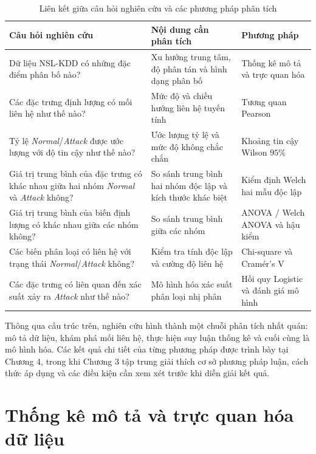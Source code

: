 \documentclass[../main.tex]{subfiles}
\begin{document}
\begin{table}[H]
\centering
\caption{Liên kết giữa câu hỏi nghiên cứu và các phương pháp phân tích}
\label{tab:t1:rq-methods}
\renewcommand{\arraystretch}{1.25}
\begin{tabularx}{\textwidth}{>{\raggedright\arraybackslash}p{} >{\raggedright\arraybackslash}p{} X}
\toprule
\textbf{Câu hỏi nghiên cứu} & \textbf{Nội dung cần phân tích} & \textbf{Phương pháp} \\
\midrule
Dữ liệu NSL-KDD có những đặc điểm phân bố nào? & Xu hướng trung tâm, độ phân tán và hình dạng phân bố & Thống kê mô tả và trực quan hóa \\
Các đặc trưng định lượng có mối liên hệ như thế nào? & Mức độ và chiều hướng liên hệ tuyến tính & Tương quan Pearson \\
Tỷ lệ \textit{Normal}/\allowbreak\textit{Attack} được ước lượng với độ tin cậy như thế nào? & Ước lượng tỷ lệ và mức độ không chắc chắn & Khoảng tin cậy Wilson $95\%$ \\
Giá trị trung bình của đặc trưng có khác nhau giữa hai nhóm \textit{Normal} và \textit{Attack} không? & So sánh trung bình hai nhóm độc lập và kích thước khác biệt & Kiểm định Welch hai mẫu độc lập \\
Giá trị trung bình của biến định lượng có khác nhau giữa các nhóm không? & So sánh trung bình giữa các nhóm & ANOVA / Welch ANOVA và hậu kiểm \\
Các biến phân loại có liên hệ với trạng thái \textit{Normal}/\allowbreak\textit{Attack} không? & Kiểm tra tính độc lập và cường độ liên hệ & Chi-square và Cramér's V \\
Các đặc trưng có liên quan đến xác suất xảy ra \textit{Attack} như thế nào? & Mô hình hóa xác suất phân loại nhị phân & Hồi quy Logistic và đánh giá mô hình \\
\bottomrule
\end{tabularx}
\end{table}

Thông qua cấu trúc trên, nghiên cứu hình thành một chuỗi phân tích nhất quán: mô tả dữ liệu, khám phá mối liên hệ, thực hiện suy luận thống kê và cuối cùng là mô hình hóa. Các kết quả chi tiết của từng phương pháp được trình bày tại Chương 4, trong khi Chương 3 tập trung giải thích cơ sở phương pháp luận, cách thức áp dụng và các điều kiện cần xem xét trước khi diễn giải kết quả.

\section{Thống kê mô tả và trực quan hóa dữ liệu}
\end{document}
